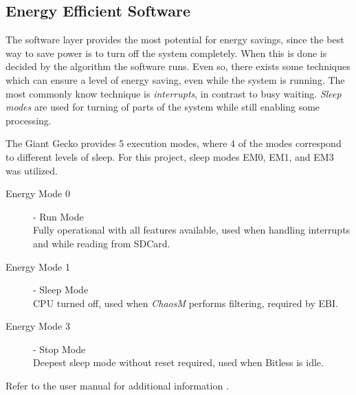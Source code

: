 \subsection{Energy Efficient Software}

The software layer provides the most potential for energy savings, since the best
way to save power is to turn off the system completely. When this is done is decided by the
algorithm the software runs. Even so, there exists some techniques which can ensure
a level of energy saving, even while the system is running. The most commonly
know technique is \textit{interrupts}, in contrast to busy waiting. {\it Sleep
modes} are used for turning of parts of the system while still enabling some
processing.

The Giant Gecko provides 5 execution modes, where 4 of the modes correspond to different levels
of sleep. For this project, sleep modes EM0, EM1, and EM3 was utilized.


\begin{description}
	\item[Energy Mode 0] - Run Mode \hfill \\
		Fully operational with all features available, used when handling
interrupts and while reading from SDCard.
	\item[Energy Mode 1] - Sleep Mode \hfill \\
		CPU turned off, used when \textit{ChaosM} performs filtering, required
by EBI.
	\item[Energy Mode 3] - Stop Mode \hfill \\
		Deepest sleep mode without reset required, used when Bitless is idle.
\end{description}
Refer to the user manual for additional information \cite{efm32gg}.
